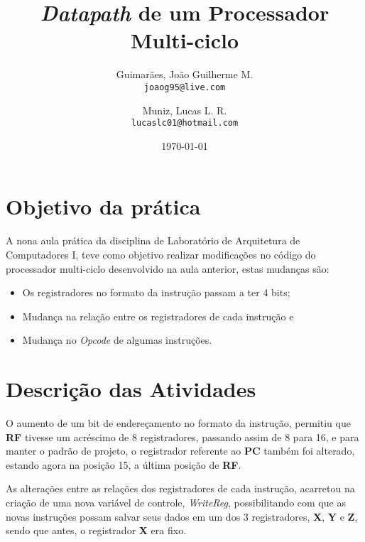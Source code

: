 \documentclass[12pt, a4paper]{article}
\title{\textbf{\textit{Datapath} de um Processador Multi-ciclo}}
\author{
	Guimarães, João Guilherme M.\\
	\texttt{joaog95@live.com}
	\and
	Muniz, Lucas L. R.\\
	\texttt{lucaslc01@hotmail.com}
}
\date{\today}
\begin{document}
	\maketitle
	
	\vspace{1cm}
	
	\section{Objetivo da prática}
	
	\par A nona aula prática da disciplina de Laboratório de Arquitetura de Computadores I, teve como objetivo realizar modificações no código do processador multi-ciclo desenvolvido na aula anterior, estas mudanças são:
	
	\begin{itemize}
		\item Os registradores no formato da instrução passam a ter 4 bits;

		\item Mudança na relação entre os registradores de cada instrução e

		\item Mudança no \textit{Opcode} de algumas instruções.
	\end{itemize}

    \section{Descrição das Atividades}

    \par O aumento de um bit de endereçamento no formato da instrução, permitiu que \textbf{RF} tivesse um acréscimo de 8 registradores, passando assim de 8 para 16, e para manter o padrão de projeto, o registrador referente ao \textbf{PC} também foi alterado, estando agora na posição 15, a última posição de \textbf{RF}.
    
    \vspace{\baselineskip}
    
    \par As alterações entre as relações dos registradores de cada instrução, acarretou na criação de uma nova variável de controle, \textit{WriteReg}, possibilitando com que as novas instruções possam salvar seus dados em um dos 3 registradores, \textbf{X}, \textbf{Y} e \textbf{Z}, sendo que antes, o registrador \textbf{X} era fixo.
\end{document}
